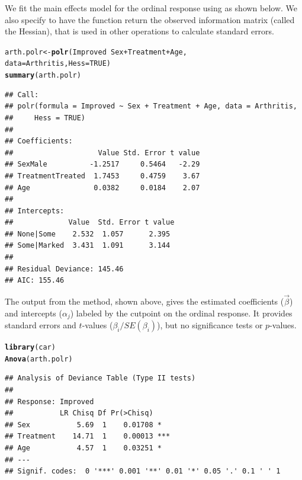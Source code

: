 \documentclass[11pt]{book}\usepackage[]{graphicx}\usepackage[]{color}
\makeatletter
\newcommand{\hlnum}[1]{\textcolor[rgb]{0.686,0.059,0.569}{#1}}%
\newcommand{\hlopt}[1]{\textcolor[rgb]{0,0,0}{#1}}%
\newcommand{\hlstd}[1]{\textcolor[rgb]{0.345,0.345,0.345}{#1}}%
\newcommand{\hlkwb}[1]{\textcolor[rgb]{0.69,0.353,0.396}{#1}}%
\newcommand{\hlkwc}[1]{\textcolor[rgb]{0.333,0.667,0.333}{#1}}%
\newcommand{\hlkwd}[1]{\textcolor[rgb]{0.737,0.353,0.396}{\textbf{#1}}}%
\newenvironment{kframe}{%
 \def\at@end@of@kframe{}%
 \ifinner\ifhmode%
  \def\at@end@of@kframe{\end{minipage}}%
  \begin{minipage}{\columnwidth}%
 \fi\fi%
 \def\FrameCommand##1{\hskip\@totalleftmargin \hskip-\fboxsep
 \colorbox{shadecolor}{##1}\hskip-\fboxsep
     \hskip-\linewidth \hskip-\@totalleftmargin \hskip\columnwidth}%
 \MakeFramed {\advance\hsize-\width
   \@totalleftmargin\z@ \linewidth\hsize
   \@setminipage}}%
 {\par\unskip\endMakeFramed%
 \at@end@of@kframe}
\newenvironment{knitrout}{}{} %
\renewenvironment{knitrout}{\small\renewcommand{\baselinestretch}{.85}}{} %
\makeatother
\begin{document}
We fit the main effects model for the ordinal response using  as shown below.
We also specify  to have the function return the observed information
matrix (called the Hessian), that is used in other operations to calculate standard errors.
\begin{knitrout}
\color{fgcolor}\begin{kframe}
\begin{alltt}
\hlstd{arth.polr} \hlkwb{<-} \hlkwd{polr}\hlstd{(Improved} \hlopt{~} \hlstd{Sex} \hlopt{+} \hlstd{Treatment} \hlopt{+} \hlstd{Age,}
                  \hlkwc{data}\hlstd{=Arthritis,} \hlkwc{Hess}\hlstd{=}\hlnum{TRUE}\hlstd{)}
\hlkwd{summary}\hlstd{(arth.polr)}
\end{alltt}
\begin{verbatim}
## Call:
## polr(formula = Improved ~ Sex + Treatment + Age, data = Arthritis, 
##     Hess = TRUE)
## 
## Coefficients:
##                    Value Std. Error t value
## SexMale          -1.2517     0.5464   -2.29
## TreatmentTreated  1.7453     0.4759    3.67
## Age               0.0382     0.0184    2.07
## 
## Intercepts:
##             Value  Std. Error t value
## None|Some    2.532  1.057      2.395 
## Some|Marked  3.431  1.091      3.144 
## 
## Residual Deviance: 145.46 
## AIC: 155.46
\end{verbatim}
\end{kframe}
\end{knitrout}
The output from the  method, shown above, gives the estimated
coefficients ($\vec{\beta}$) and intercepts ($\alpha_j$) labeled by the 
cutpoint on the ordinal response. It provides standard errors and $t$-values
($\beta_i / SE(\beta_i)$), but no significance tests or $p$-values.

\begin{knitrout}
\color{fgcolor}\begin{kframe}
\begin{alltt}
\hlkwd{library}\hlstd{(car)}
\hlkwd{Anova}\hlstd{(arth.polr)}
\end{alltt}
\begin{verbatim}
## Analysis of Deviance Table (Type II tests)
## 
## Response: Improved
##           LR Chisq Df Pr(>Chisq)    
## Sex           5.69  1    0.01708 *  
## Treatment    14.71  1    0.00013 ***
## Age           4.57  1    0.03251 *  
## ---
## Signif. codes:  0 '***' 0.001 '**' 0.01 '*' 0.05 '.' 0.1 ' ' 1
\end{verbatim}
\end{kframe}
\end{knitrout}
\end{document}
